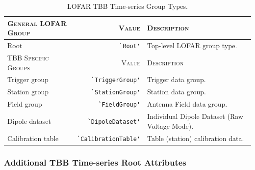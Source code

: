 \documentclass[a4paper,10pt,bibtotoc]{scrartcl}
\begin{document}
\begin{table}[tbp]
  \centering
  \begin{tabular}{|lrp{6cm}|}
    \hline
    \textsc{General LOFAR Group} & \textsc{Value} & \textsc{Description} \\
    \hline
    Root          & \verb|`Root'|    & Top-level LOFAR group type.\\
    \hline
    \hline
    \textsc{TBB Specific Groups} & \textsc{Value} & \textsc{Description} \\
    \hline
    
    Trigger group & \verb|`TriggerGroup'| &  Trigger data group. \\
    Station group & \verb|`StationGroup'| & Station data group. \\
    Field group & \verb|`FieldGroup'|  & Antenna Field data group. \\
    Dipole dataset & \verb|`DipoleDataset'| & Individual Dipole Dataset (Raw Voltage Mode). \\
    Calibration table & \verb|`CalibrationTable'| & Table (station) calibration data. \\
    \hline
  \end{tabular}
  \caption{LOFAR TBB Time-series Group Types.}
  \label{tab:group types}
\end{table}




\subsubsection{Additional TBB Time-series Root Attributes}
\label{sec:additional root group attributes}
\end{document}
